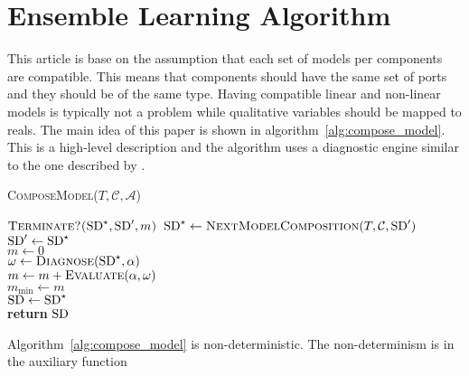 \section{Ensemble Learning Algorithm}
%
This article is base on the assumption that each set of models per
components are compatible. This means that components should have the
same set of ports and they should be of the same type. Having
compatible linear and non-linear models is typically not a problem
while qualitative variables should be mapped to reals. The main idea
of this paper is shown in algorithm~\ref{alg:compose_model}. This is a
high-level description and the algorithm uses a diagnostic engine
similar to the one described by \cite{feldman13genius}.
%
\begin{algorithm}[htb]
\begin{footnotesize}
%
\caption{\textsc{ComposeModel}($T, \mathcal{C}, \mathcal{A}$)}
\label{alg:compose_model}
%
%
%
\vspace{0.075in}
%
\Repeat
{
$\textsc{Terminate?($\mathrm{SD}^\star, \mathrm{SD}^\prime, m$)}$
}
{
    $\mathrm{SD}^\star \gets \textsc{NextModelComposition}(T, \mathcal{C}, \mathrm{SD}^\prime)$\label{alg:next_model_composition}\\
    $\mathrm{SD}^\prime \gets \mathrm{SD}^\star$\\
    $m \gets 0$\\
    {
        $\omega \gets \textsc{Diagnose}(\mathrm{SD}^\star, \alpha)$\label{alg:diagnose}\\
        $m \gets m + \textsc{Evaluate}(\alpha, \omega)$\label{alg:evaluate}\\
    }
    {
        $m_{\min} \gets m$\\
        $\mathrm{SD} \gets \mathrm{SD}^\star$\label{alg:accept_end}\\
    }
}
\textbf{return} $\mathrm{SD}$
%
\end{footnotesize}
\end{algorithm}
%
\par
%
Algorithm~\ref{alg:compose_model} is non-deterministic. The
non-determinism is in the auxiliary function
